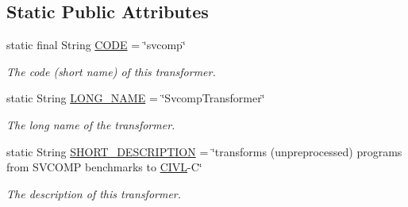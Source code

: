 \subsection*{Static Public Attributes}
\begin{DoxyCompactItemize}
\item 
\hypertarget{classedu_1_1udel_1_1cis_1_1vsl_1_1civl_1_1transform_1_1IF_1_1SvcompTransformer_ae785a9cd610e0c768e527d8c6afc9e3d}{}static final String \hyperlink{classedu_1_1udel_1_1cis_1_1vsl_1_1civl_1_1transform_1_1IF_1_1SvcompTransformer_ae785a9cd610e0c768e527d8c6afc9e3d}{C\+O\+D\+E} = \char`\"{}svcomp\char`\"{}\label{classedu_1_1udel_1_1cis_1_1vsl_1_1civl_1_1transform_1_1IF_1_1SvcompTransformer_ae785a9cd610e0c768e527d8c6afc9e3d}

\begin{DoxyCompactList}\small\item\em The code (short name) of this transformer. \end{DoxyCompactList}\item 
\hypertarget{classedu_1_1udel_1_1cis_1_1vsl_1_1civl_1_1transform_1_1IF_1_1SvcompTransformer_a772838c3b1b2ef3f6d48974d6a5f1672}{}static String \hyperlink{classedu_1_1udel_1_1cis_1_1vsl_1_1civl_1_1transform_1_1IF_1_1SvcompTransformer_a772838c3b1b2ef3f6d48974d6a5f1672}{L\+O\+N\+G\+\_\+\+N\+A\+M\+E} = \char`\"{}Svcomp\+Transformer\char`\"{}\label{classedu_1_1udel_1_1cis_1_1vsl_1_1civl_1_1transform_1_1IF_1_1SvcompTransformer_a772838c3b1b2ef3f6d48974d6a5f1672}

\begin{DoxyCompactList}\small\item\em The long name of the transformer. \end{DoxyCompactList}\item 
\hypertarget{classedu_1_1udel_1_1cis_1_1vsl_1_1civl_1_1transform_1_1IF_1_1SvcompTransformer_ad4525cfa5b95f6ee6732aa71220a203b}{}static String \hyperlink{classedu_1_1udel_1_1cis_1_1vsl_1_1civl_1_1transform_1_1IF_1_1SvcompTransformer_ad4525cfa5b95f6ee6732aa71220a203b}{S\+H\+O\+R\+T\+\_\+\+D\+E\+S\+C\+R\+I\+P\+T\+I\+O\+N} = \char`\"{}transforms (unpreprocessed) programs from S\+V\+C\+O\+M\+P benchmarks to \hyperlink{classedu_1_1udel_1_1cis_1_1vsl_1_1civl_1_1CIVL}{C\+I\+V\+L}-\/C\char`\"{}\label{classedu_1_1udel_1_1cis_1_1vsl_1_1civl_1_1transform_1_1IF_1_1SvcompTransformer_ad4525cfa5b95f6ee6732aa71220a203b}

\begin{DoxyCompactList}\small\item\em The description of this transformer. \end{DoxyCompactList}\end{DoxyCompactItemize}


